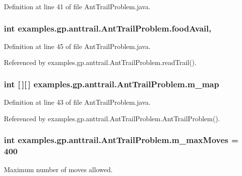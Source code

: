 Definition at line 41 of file Ant\-Trail\-Problem.\-java.

\hypertarget{classexamples_1_1gp_1_1anttrail_1_1_ant_trail_problem_a0c198af0aeb47b118c553a4f0c3304a9}{
\subsubsection[{food\-Avail}]{\setlength{\rightskip}{0pt plus 5cm}int examples.\-gp.\-anttrail.\-Ant\-Trail\-Problem.\-food\-Avail\hspace{0.3cm}{\ttfamily [static]}, {\ttfamily [private]}}}\label{classexamples_1_1gp_1_1anttrail_1_1_ant_trail_problem_a0c198af0aeb47b118c553a4f0c3304a9}


Definition at line 45 of file Ant\-Trail\-Problem.\-java.



Referenced by examples.\-gp.\-anttrail.\-Ant\-Trail\-Problem.\-read\-Trail().

\hypertarget{classexamples_1_1gp_1_1anttrail_1_1_ant_trail_problem_a0a48abbd71c41c8289e11b939905acc0}{
\subsubsection[{m\-\_\-map}]{\setlength{\rightskip}{0pt plus 5cm}int \mbox{[}$\,$\mbox{]}\mbox{[}$\,$\mbox{]} examples.\-gp.\-anttrail.\-Ant\-Trail\-Problem.\-m\-\_\-map\hspace{0.3cm}{\ttfamily [protected]}}}\label{classexamples_1_1gp_1_1anttrail_1_1_ant_trail_problem_a0a48abbd71c41c8289e11b939905acc0}


Definition at line 43 of file Ant\-Trail\-Problem.\-java.



Referenced by examples.\-gp.\-anttrail.\-Ant\-Trail\-Problem.\-Ant\-Trail\-Problem().

\hypertarget{classexamples_1_1gp_1_1anttrail_1_1_ant_trail_problem_a6d71eb276ff0940142ab87cac220c45a}{
\subsubsection[{m\-\_\-max\-Moves}]{\setlength{\rightskip}{0pt plus 5cm}int examples.\-gp.\-anttrail.\-Ant\-Trail\-Problem.\-m\-\_\-max\-Moves = 400\hspace{0.3cm}{\ttfamily [static]}}}\label{classexamples_1_1gp_1_1anttrail_1_1_ant_trail_problem_a6d71eb276ff0940142ab87cac220c45a}
Maximum number of moves allowed. 


